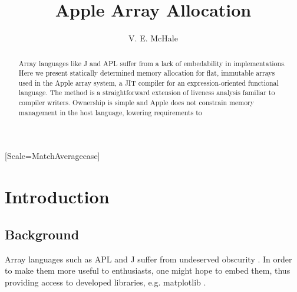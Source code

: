 \documentclass[sigplan,screen,anonymous]{acmart}
\begin{document}
\setmonofont{Jet Brains Mono}[Scale=MatchAveragecase]



\begin{abstract}
    Array languages like J and APL suffer from a lack of embedability in implementations.
    Here we present statically determined memory allocation for flat, immutable arrays used in the Apple array system, a JIT compiler for an expression-oriented functional language.
    The method is a straightforward extension of liveness analysis familiar to compiler writers.
    Ownership is simple and Apple does not constrain memory management in the host language, lowering requirements to
\end{abstract}

\title{Apple Array Allocation}
\author{V. E. McHale}
\maketitle

\section{Introduction}

\subsection{Background}

Array languages such as APL and J suffer from undeserved obscurity \cite{hsu2023}. In order to make them more useful to enthusiasts, one might hope to embed them, thus providing access to developed libraries, e.g. matplotlib \cite{hunter2007}.

\end{document}
